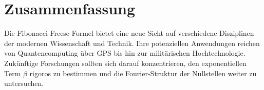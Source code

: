 \documentclass[a4paper,12pt]{article}
\begin{document}
\section{Zusammenfassung}

Die Fibonacci-Freese-Formel bietet eine neue Sicht auf verschiedene Disziplinen der modernen Wissenschaft und Technik. Ihre potenziellen Anwendungen reichen von Quantencomputing über GPS bis hin zur militärischen Hochtechnologie. Zukünftige Forschungen sollten sich darauf konzentrieren, den exponentiellen Term $\beta$ rigoros zu bestimmen und die Fourier-Struktur der Nullstellen weiter zu untersuchen.
\end{document}
